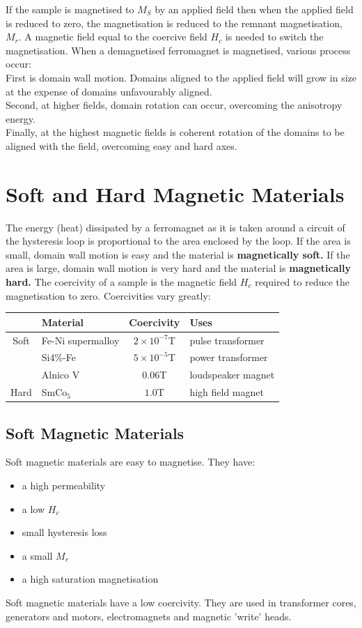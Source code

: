 \documentclass[a4paper, 11pt, normalem]{report}
\begin{document}
If the sample is magnetised to $M_S$ by an applied field then when the applied field is reduced to zero, the magnetisation is reduced to the remnant magnetisation, $M_r$.
A magnetic field equal to the coercive field $H_c$ is needed to switch the magnetisation. 
When a demagnetised ferromagnet is magnetised, various process occur: \\
First is domain wall motion. 
Domains aligned to the applied field will grow in size at the expense of domains unfavourably aligned.\\
Second, at higher fields, domain rotation can occur, overcoming the anisotropy energy. \\
Finally, at the highest magnetic fields is coherent rotation of the domains to be aligned with the field, overcoming easy and hard axes.

\section{Soft and Hard Magnetic Materials}
The energy (heat) dissipated by a ferromagnet as it is taken around a circuit of the hysteresis loop is proportional to the area enclosed by the loop. 
If the area is small, domain wall motion is easy and the material is \textbf{magnetically soft.}
If the area is large, domain wall motion is very hard and the material is \textbf{magnetically hard.}
The coercivity of a sample is the magnetic field $H_c$ required to reduce the magnetisation to zero.
Coercivities vary greatly:
\begin{center}
    \begin{tabular}{c|l|c|l}
                           & Material & Coercivity & Uses \\
        \hline
        {\color{red} Soft} & Fe-Ni supermalloy & $2\times10^{-7}$T & pulse transformer \\
                           & Si4\%-Fe & $5\times10^{-5}$T & power transformer \\
                           & Alnico V & $0.06$T & loudspeaker magnet \\
        {\color{red} Hard} & SmCo$_5$ & $1.0$T & high field magnet 
    \end{tabular}
\end{center}

\subsection{Soft Magnetic Materials}
Soft magnetic materials are easy to magnetise. 
They have:
\begin{itemize}
    \item a high permeability 
    \item a low $H_c$
    \item small hysteresis loss 
    \item a small $M_r$ 
    \item a high saturation magnetisation
\end{itemize}
Soft magnetic materials have a low coercivity. 
They are used in transformer cores, generators and motors, electromagnets and magnetic 'write' heads.
\end{document}

